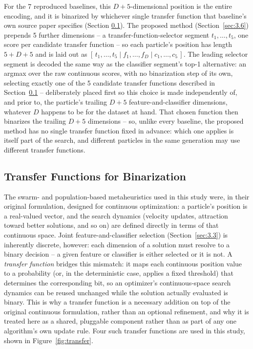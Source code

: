For the 7 reproduced baselines, this $D+5$-dimensional position is the
entire encoding, and it is binarized by whichever single transfer
function that baseline's own source paper specifies (Section
\ref{sec:3.4}). The proposed method (Section~\ref{sec:3.6}) prepends 5
further dimensions -- a transfer-function-selector segment
$t_1,\dots,t_5$, one score per candidate transfer function -- so each
particle's position has length $5+D+5$ and is laid out as
$[\,t_1,\dots,t_5 \mid f_1,\dots,f_D \mid c_1,\dots,c_5\,]$. The leading
selector segment is decoded the same way as the classifier segment's
top-1 alternative: an argmax over the raw continuous scores, with no
binarization step of its own, selecting exactly one of the 5 candidate
transfer functions described in Section~\ref{sec:3.4} -- deliberately
placed first so this choice is made independently of, and prior to, the
particle's trailing $D+5$ feature-and-classifier dimensions, whatever $D$
happens to be for the dataset at hand. That chosen function then
binarizes the trailing $D+5$ dimensions -- so, unlike every baseline, the
proposed method has no single transfer function fixed in advance: which
one applies is itself part of the search, and different particles in the
same generation may use different transfer functions.

\subsection{Transfer Functions for Binarization}
\label{sec:3.4}

The swarm- and population-based metaheuristics used in this study were,
in their original formulation, designed for continuous optimization: a
particle's position is a real-valued vector, and the search dynamics
(velocity updates, attraction toward better solutions, and so on) are
defined directly in terms of that continuous space. Joint
feature-and-classifier selection (Section~\ref{sec:3.3}) is inherently
discrete, however: each dimension of a solution must resolve to a binary
decision -- a given feature or classifier is either selected or it is
not. A \emph{transfer function} bridges this mismatch: it maps each
continuous position value to a probability (or, in the deterministic
case, applies a fixed threshold) that determines the corresponding bit,
so an optimizer's continuous-space search dynamics can be reused
unchanged while the solution actually evaluated is binary. This is why a
transfer function is a necessary addition on top of the original
continuous formulation, rather than an optional refinement, and why it is
treated here as a shared, pluggable component rather than as part of any
one algorithm's own update rule. Four such transfer functions are used in
this study, shown in Figure~\ref{fig:transfer}.

